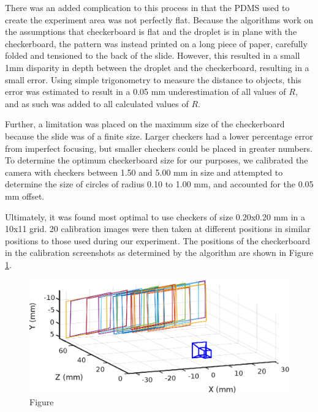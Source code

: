 \documentclass{physics_article_B}
\begin{document}
            There was an added complication to this process in that the PDMS used to create the experiment area was not perfectly flat. Because the algorithms work on the assumptions that checkerboard is flat and the droplet is in plane with the checkerboard, the pattern was instead printed on a long piece of paper, carefully folded and tensioned to the back of the slide. However, this resulted in a small 1mm disparity in depth between the droplet and the checkerboard, resulting in a small error. Using simple trigonometry to measure the distance to objects, this error was estimated to result in a 0.05 mm underestimation of all values of $R$, and as such was added to all calculated values of $R$. 
            
            Further, a limitation was placed on the maximum size of the checkerboard because the slide was of a finite size. Larger checkers had a lower percentage error from imperfect focusing, but smaller checkers could be placed in greater numbers. To determine the optimum checkerboard size for our purposes, we calibrated the camera with checkers between 1.50 and 5.00 mm in size and attempted to determine the size of circles of radius 0.10 to 1.00 mm, and accounted for the 0.05 mm offset. 
            
            Ultimately, it was found most optimal to use checkers of size 0.20x0.20 mm in a 10x11 grid. 20 calibration images were then taken at different positions in similar positions to those used during our experiment. The positions of the checkerboard in the calibration screenshots as determined by the algorithm are shown in Figure \ref{fig:calib}.
            
                \begin{figure}[H]
                    \centering\includegraphics{Figures/CameraExtrinsics.eps}
                    \caption{Figure }\label{fig:calib}
                \end{figure}
            
\end{document}
